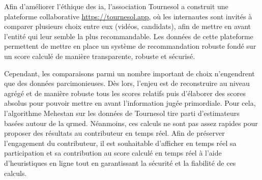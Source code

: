 Afin d'améliorer l'éthique des \gls{ia}, l'association Tournesol a construit une plateforme collaborative \href{https://tournesol.app}{https://tournesol.app}, où les internautes sont invités à comparer plusieurs choix entre eux (vidéos, candidats), afin de mettre en avant l'entité qui leur semble la plus recommandable. Les données de cette plateforme permettent de mettre en place un système de recommandation robuste fondé sur un score calculé de manière transparente, robuste et sécurisé.

Cependant, les comparaisons parmi un nombre important de choix n'engendrent que des données parcimonieuses. Dès lors, l'enjeu est de reconstruire au niveau agrégé et de manière robuste tous les scores relatifs puis d'élaborer des scores absolus pour pouvoir mettre en avant l'information jugée primordiale. Pour cela, l'algorithme Mehestan sur les données de Tournesol tire parti d'estimateurs basées autour de la \gls{qrmed}. Néanmoins, ces calculs ne sont pas assez rapides pour proposer des résultats au contributeur en temps réel. Afin de préserver l'engagement du contributeur, il est souhaitable d'afficher en temps réel sa participation et sa contribution au score calculé en temps réel à l'aide d'heuristiques en ligne tout en garantissant la sécurité et la fiabilité de ces calculs.

\pagebreak